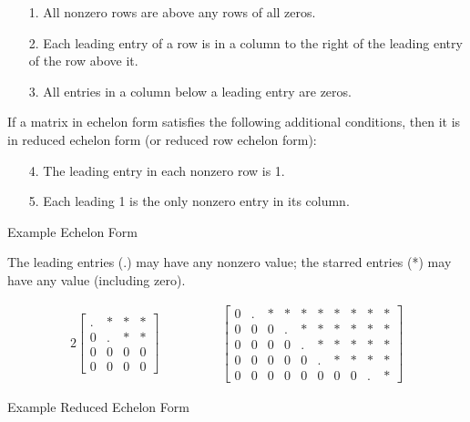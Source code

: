 \documentclass{article}
\begin{document}
\begin{tcolorbox}[colback=blue!10!white,colframe=blue!60!black,title=Echelon Form Properties]
    \begin{itemize}
        \item[1.] All nonzero rows are above any rows of all zeros.
        \item[2.] Each leading entry of a row is in a column to the right of the leading entry of the row above it.
        \item[3.] All entries in a column below a leading entry are zeros.
    \end{itemize}
    If a matrix in echelon form satisfies the following additional conditions, then it is in reduced echelon form (or reduced row echelon form):
    \begin{itemize}
        \item[4.] The leading entry in each nonzero row is 1.
        \item[5.] Each leading 1 is the only nonzero entry in its column.
    \end{itemize}
\end{tcolorbox}

\begin{large}
    Example Echelon Form
\end{large}

The leading entries (.) may have any nonzero value; the starred entries (*) may have any value (including zero).

\begin{alignat*}{2}
    \begin{bmatrix}
        .&*&*&*\\
        0&.&*&*\\
        0&0&0&0\\
        0&0&0&0
    \end{bmatrix}
    & \hspace{ 4em}%
    \begin{bmatrix}
        0&.&*&*&*&*&*&*&*&*\\
        0&0&0&.&*&*&*&*&*&*\\
        0&0&0&0&.&*&*&*&*&*\\
        0&0&0&0&0&.&*&*&*&*\\
        0&0&0&0&0&0&0&0&.&*
    \end{bmatrix}
\end{alignat*}

\pagebreak

\begin{large}
    Example Reduced Echelon Form
\end{large}
\end{document}

